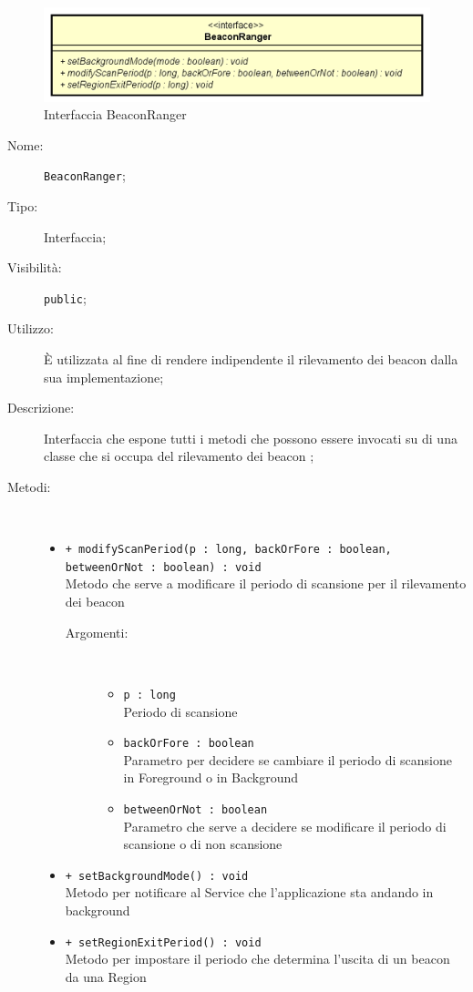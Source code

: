 \documentclass[../DefinizioneDiProdotto.tex]{subfiles}
\begin{document}
    \begin{figure}[H]
        \centering
        \includegraphics{img/BeaconRanger.png}
        \caption{Interfaccia BeaconRanger}\label{fig:model::beacon::BeaconRanger} 
    \end{figure}
    \begin{description}
\item[Nome:] \texttt{BeaconRanger};
\item[Tipo:] Interfaccia;
\item[Visibilità:] \texttt{public};
\item[Utilizzo:] È utilizzata al fine di rendere indipendente il rilevamento dei beacon dalla sua implementazione;
\item[Descrizione:] Interfaccia che espone tutti i metodi che possono essere invocati su di una classe che si occupa del rilevamento dei beacon ;
\item[Metodi:] \
\begin{itemize}
\item \texttt{+ modifyScanPeriod(p : long, backOrFore : boolean, betweenOrNot : boolean) : void}\\
Metodo che serve a modificare il periodo di scansione per il rilevamento dei beacon
 \begin{description}
\item[Argomenti:] \
\begin{itemize}
\item \texttt{p : long}\\
Periodo di scansione\item \texttt{backOrFore : boolean}\\
Parametro per decidere se cambiare il periodo di scansione in Foreground o in Background\item \texttt{betweenOrNot : boolean}\\
Parametro che serve a decidere se modificare il periodo di scansione o di non scansione\end{itemize}
\end{description}
\item \texttt{+ setBackgroundMode() : void}\\
Metodo per notificare al Service che l'applicazione sta andando in background 
 \item \texttt{+ setRegionExitPeriod() : void}\\
Metodo per impostare il periodo che determina l'uscita di un beacon da una Region
 \end{itemize}
\end{description}
\end{document}
